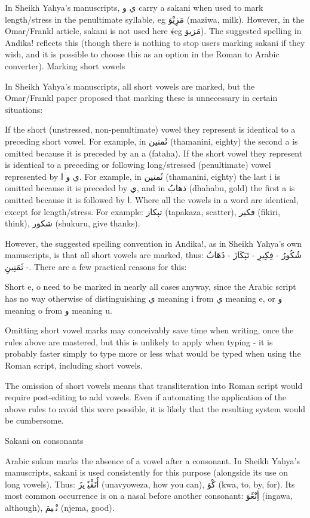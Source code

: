 \documentclass[a4paper,10pt]{article}
\begin{document}
In Sheikh Yahya's manuscripts, ي و carry a sakani when used to mark length/stress in the penultimate syllable, eg مَزِيْوَ (maziwa, milk). However, in the Omar/Frankl article, sakani is not used here ﴾eg مَزيوَ). The suggested spelling in Andika! reflects this (though there is nothing to stop users marking sakani if they wish, and it is possible to choose this as an option in the Roman to Arabic converter).
Marking short vowels

In Sheikh Yahya's manuscripts, all short vowels are marked, but the Omar/Frankl paper proposed that marking these is unnecessary in certain situations:

    If the short (unstressed, non-penultimate) vowel they represent is identical to a preceding short vowel. For example, in ثَمنين (thamanini, eighty) the second a is omitted because it is preceded by an a (fataha).
    If the short vowel they represent is identical to a preceding or following long/stressed (penultimate) vowel represented by ي و ا. For example, in ثَمنين (thamanini, eighty) the last i is omitted because it is preceded by ي, and in ذهابُ (dhahabu, gold) the first a is omitted because it is followed by ا.
    Where all the vowels in a word are identical, except for length/stress. For example: تپكاز (tapakaza, scatter), فكير (fikiri, think), شكور (shukuru, give thanks).

However, the suggested spelling convention in Andika!, as in Sheikh Yahya's own manuscripts, is that all short vowels are marked, thus: شُكُورُ - فِكِيرِ - تَپَكَازَ - ذَهَابُ - ثَمَنِينِ. There are a few practical reasons for this:

Short e, o need to be marked in nearly all cases anyway, since the Arabic script has no way otherwise of distinguishing ي meaning i from ي meaning e, or و meaning o from و meaning u.

Omitting short vowel marks may conceivably save time when writing, once the rules above are mastered, but this is unlikely to apply when typing - it is probably faster simply to type more or less what would be typed when using the Roman script, including short vowels.

The omission of short vowels means that transliteration into Roman script would require post-editing to add vowels. Even if automating the application of the above rules to avoid this were possible, it is likely that the resulting system would be cumbersome.

Sakani on consonants

Arabic sukun marks the absence of a vowel after a consonant. In Sheikh Yahya's manuscripts, sakani is used consistently for this purpose (alongside its use on long vowels). Thus: أُنَڤْيٗوٖيزَ (unavyoweza, how you can), كْوَ (kwa, to, by, for). Its most common occurrence is on a nasal before another consonant: أِنْڠَوَ (ingawa, although), نْجٖيمَ (njema, good).
\end{document}
